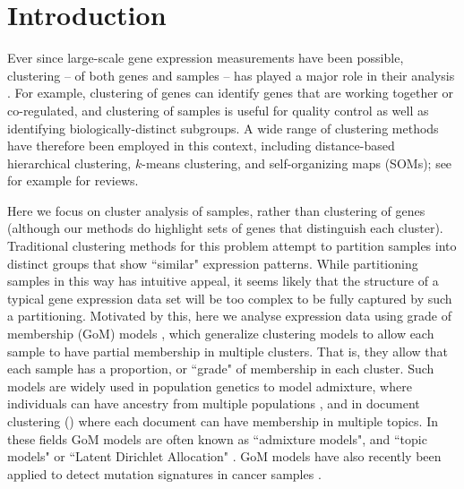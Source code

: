 \section{Introduction}

Ever since large-scale gene expression measurements have been possible, clustering -- of both genes and samples -- 
has played a major role in their analysis \cite{Eisen1998}\cite{Golub1999} \cite{Alizadeh2000}.
For example, clustering of genes can identify genes that are working together or co-regulated, and clustering of samples is useful for quality control 
as well as identifying biologically-distinct subgroups. A wide range of clustering methods have therefore
been employed in this context, including distance-based hierarchical clustering, $k$-means clustering, and self-organizing maps (SOMs); see for example \cite{D'haeseleer2005} \cite{Jiang2004} for reviews. 

Here we focus on cluster analysis of samples, rather than clustering of genes (although our methods do highlight sets of genes that distinguish each cluster). 
Traditional clustering methods for this problem attempt to partition samples into distinct groups that show ``similar" expression patterns. 
While partitioning samples in this way has intuitive appeal, 
it seems likely that the structure of a typical gene expression data set will be too complex to be fully captured by such a partitioning. 
Motivated by this, here we analyse expression data using grade of membership (GoM) models \cite{Erosheva2006}, which generalize clustering models 
to allow each sample to have partial membership in multiple clusters.
That is, they allow that each sample has a proportion, or ``grade" of membership in each cluster. Such
models are widely used in population genetics to model admixture, where individuals can have ancestry from multiple populations \cite{Pritchard2000},
and in document clustering (\cite{Blei2003,Blei2009}) where each document can have membership in multiple topics. In these fields
GoM models are often known as ``admixture models", and ``topic models" or ``Latent Dirichlet Allocation" \cite{Blei2003}. GoM models have also recently
been applied to detect mutation signatures in cancer samples \cite{Shiraishi2015}.



